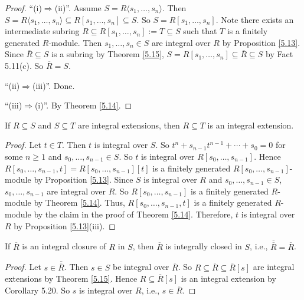 \begin{proof}
    ``(i)$\Rightarrow$(ii)''. Assume $S = R\langle s_1,\ldots,s_n \rangle$. Then $S = R\langle s_1,\ldots,s_n \rangle \subseteq R[s_1,\ldots,s_n] \subseteq S$. So $S = R[s_1,\ldots,s_n]$. Note there exists an intermediate subring $R \subseteq R[s_1,\ldots,s_n] := T \subseteq S$ such that $T$ is a finitely generated $R$-module. Then $s_1,\ldots,s_n \in S$ are integral over $R$ by Proposition \ref{5.13}. Since $\overbar{R} \subseteq S$ is a subring by Theorem \ref{5.15}, $S = R[s_1,\ldots,s_n] \subseteq \overbar{R} \subseteq S$ by Fact 5.11(c). So $\overbar{R} = S$. \par
    ``(ii)$\Rightarrow$(iii)''. Done. \par 
    ``(iii)$\Rightarrow$(i)''. By Theorem \ref{5.14}.
\end{proof}


\begin{corollary}\label{5.20}
    If $R \subseteq S$ and $S \subseteq T$ are integral extensions, then $R \subseteq T$ is an integral extension.
\end{corollary}

\begin{proof}
    Let $t \in T$. Then $t$ is integral over $S$. So $t^n + s_{n-1} t^{n-1} + \cdots + s_0 = 0$ for some $n \geq 1$ and $s_0,\ldots,s_{n-1} \in S$. So $t$ is integral over $R[s_0,\ldots,s_{n-1}]$. Hence $R[s_0,\ldots,s_{n-1},t] = R[s_0,\ldots,s_{n-1}][t]$ is a finitely generated $R[s_0,\ldots,s_{n-1}]$-module by Proposition \ref{5.13}. Since $S$ is integral over $R$ and $s_0,\ldots,s_{n-1} \in S$, $s_0,\ldots,s_{n-1}$ are integral over $R$. So $R[s_0,\ldots,s_{n-1}]$ is a finitely generated $R$-module by Theorem \ref{5.14}. Thus, $R[s_0,\ldots,s_{n-1},t]$ is a finitely generated $R$-module by the claim in the proof of Theorem \ref{5.14}. Therefore, $t$ is integral over $R$ by Proposition \ref{5.13}(iii).
\end{proof}

\begin{corollary}\label{5.21}
    If $\overbar{R}$ is an integral closure of $R$ in $S$, then $\overbar{R}$ is integrally closed in $S$, i.e., ${\overbar{\overbar{R}}} = \overbar{R}$.
\end{corollary}

\begin{proof}
    Let $s \in \overbar{\overbar{R}}$. Then $s \in S$ be integral over $\overbar{R}$. So $R \subseteq \overbar{R} \subseteq \overbar{R}[s]$ are integral extensions by Theorem \ref{5.15}. Hence $R \subseteq \overbar{R}[s]$ is an integral extension by Corollary 5.20. So $s$ is integral over $R$, i.e., $s \in \overbar{R}$.
\end{proof}

